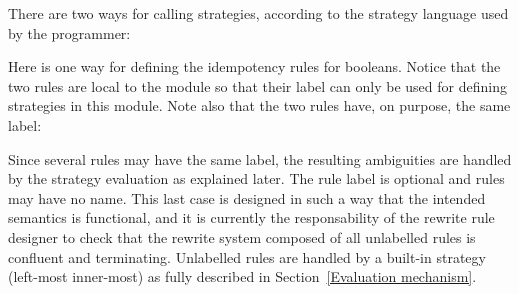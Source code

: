 
There are two ways for calling strategies, according to the
strategy language used by the programmer:



\EX
Here is one way for defining the idempotency rules for
booleans. Notice that the two rules are local to the module so
that their label can only be used for defining strategies in this
module. Note also that the two rules have, on purpose, the same
label:
\FEX

Since several rules may have the same label, the resulting ambiguities
are handled by the strategy evaluation as explained later. The rule
label is optional and rules may have no name. This last case is
designed in such a way that the intended semantics is functional, and
it is currently the responsability of the rewrite rule designer to
check that the rewrite system composed of all unlabelled rules is
confluent and terminating.  Unlabelled rules are handled by a built-in
strategy (left-most inner-most) as fully described in
Section~\ref{Evaluation mechanism}.

